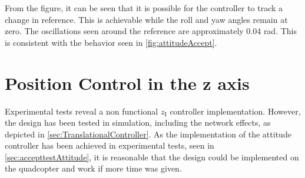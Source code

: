 From the figure, it can be seen that it is possible for the controller to track a change in reference. This is achievable while the roll and yaw angles remain at zero. The oscillations seen around the reference are approximately 0.04 rad. This is consistent with the behavior seen in \autoref{fig:attitudeAccept}.



\section{Position Control in the z axis}

Experimental tests reveal a non functional $z_{\mathrm{I}}$ controller implementation. However, the design has been tested in simulation, including the network effects, as depicted in \autoref{sec:TranslationalController}. As the implementation of the attitude controller has been achieved in experimental tests, seen in \autoref{sec:accepttestAttitude}, it is reasonable that the design could be implemented on the quadcopter and work if more time was given.



